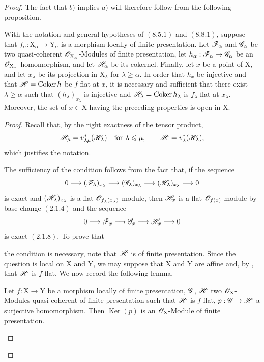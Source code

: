 \begin{proof}
The fact that $b)$ implies $a)$ will therefore follow from the following proposition.

\begin{proposition}[11.3.9]
\label{IV.11.3.9}
With the notation and general hypotheses of $(8.5.1)$ and $(8.8.1)$, suppose that $f_\alpha:\mathrm{X}_\alpha\to\mathrm{Y}_\alpha$ is a morphism locally of finite presentation. Let $\mathscr{F}_\alpha$ and $\mathscr{G}_\alpha$ be two quasi-coherent $\mathscr{O}_{\mathrm{X}_\alpha}$-Modules of finite presentation, let $h_\alpha:\mathscr{F}_\alpha\to\mathscr{G}_\alpha$ be an $\mathscr{O}_{\mathrm{X}_\alpha}$-homomorphism, and let $\mathscr{H}_\alpha$ be its cokernel. Finally, let $x$ be a point of $\mathrm{X}$, and let $x_\lambda$ be its projection in $\mathrm{X}_\lambda$ for $\lambda\geqslant\alpha$. In order that $h_x$ be injective and that $\mathscr{H}=\operatorname{Coker}h$ be $f$-flat at $x$, it is necessary and sufficient that there exist $\lambda\geqslant\alpha$ such that $(h_\lambda)_{x_\lambda}$ is injective and $\mathscr{H}_\lambda=\operatorname{Coker}h_\lambda$ is $f_\lambda$-flat at $x_\lambda$. Moreover, the set of $x\in\mathrm{X}$ having the preceding properties is open in $\mathrm{X}$.
\end{proposition}

\begin{proof}
Recall that, by the right exactness of the tensor product,
\[
  \mathscr{H}_\mu=v^*_{\lambda\mu}(\mathscr{H}_\lambda)
  \quad\text{for }\lambda\leqslant\mu,
  \qquad
  \mathscr{H}=v^*_\lambda(\mathscr{H}_\lambda),
\]
which justifies the notation.

The sufficiency of the condition follows from the fact that, if the sequence
\[
  0\longrightarrow(\mathscr{F}_\lambda)_{x_\lambda}
  \longrightarrow(\mathscr{G}_\lambda)_{x_\lambda}
  \longrightarrow(\mathscr{H}_\lambda)_{x_\lambda}
  \longrightarrow0
\]
is exact and $(\mathscr{H}_\lambda)_{x_\lambda}$ is a flat $\mathscr{O}_{f_\lambda(x_\lambda)}$-module, then $\mathscr{H}_x$ is a flat $\mathscr{O}_{f(x)}$-module by base change $(2.1.4)$ and the sequence
\[
  0\longrightarrow\mathscr{F}_x
  \longrightarrow\mathscr{G}_x
  \longrightarrow\mathscr{H}_x
  \longrightarrow0
\]
is exact $(2.1.8)$. To prove that


the condition is necessary, note that $\mathscr{H}$ is of finite presentation. Since the question is local on $\mathrm{X}$ and $\mathrm{Y}$, we may suppose that $\mathrm{X}$ and $\mathrm{Y}$ are affine and, by , that $\mathscr{H}$ is $f$-flat. We now record the following lemma.

\begin{lemma}[11.3.9.1]
\label{IV.11.3.9.1}
Let $f:\mathrm{X}\to\mathrm{Y}$ be a morphism locally of finite presentation, $\mathscr{G}$, $\mathscr{H}$ two $\mathscr{O}_\mathrm{X}$-Modules quasi-coherent of finite presentation such that $\mathscr{H}$ is $f$-flat, $p:\mathscr{G}\to\mathscr{H}$ a surjective homomorphism. Then $\operatorname{Ker}(p)$ is an $\mathscr{O}_\mathrm{X}$-Module of finite presentation.
\end{lemma}


\end{proof}
\end{proof}
